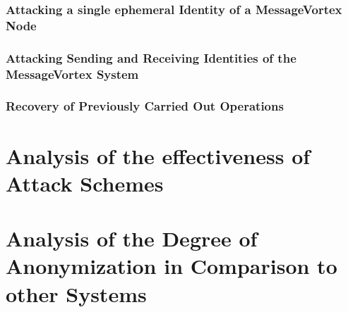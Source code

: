 \subsection{Attacking a single ephemeral Identity of a MessageVortex Node}
\subsection{Attacking Sending and Receiving Identities of the MessageVortex System}
\subsection{Recovery of Previously Carried Out Operations}

\chapter{Analysis of the effectiveness of Attack Schemes}
\chapter{Analysis of the Degree of Anonymization in Comparison to other Systems}

